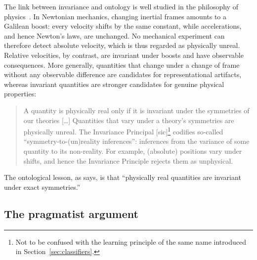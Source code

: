 The link between invariance and ontology is well studied in the philosophy of physics~\citep{saunders2003physics, jacobs2021invariance}. In Newtonian mechanics, changing inertial frames amounts to a Galilean boost: every velocity shifts by the same constant, while accelerations, and hence Newton's laws, are unchanged. No mechanical experiment can therefore detect absolute velocity, which is thus regarded as physically unreal. Relative velocities, by contrast, are invariant under boosts and have observable consequences. More generally, quantities that change under a change of frame without any observable difference are candidates for representational artifacts, whereas invariant quantities are stronger candidates for genuine physical properties:
\begin{quote}
A quantity is physically real only if it is invariant under the symmetries of our theories [\ldots] Quantities that vary under a theory's symmetries are physically unreal. The Invariance Principal [sic]\footnote{Not to be confused with the learning principle of the same name introduced in Section~\ref{sec:classifiers}.} codifies so-called ``symmetry-to-(un)reality inferences'': inferences from the variance of some quantity to its non-reality. For example, (absolute) positions vary under shifts, and hence the Invariance Principle rejects them as unphysical. \citep{jacobs2021invariance}
\end{quote}

The ontological lesson, as \citet{saunders2003physics} says, is that ``physically real quantities are invariant under exact symmetries.''

\subsection{The pragmatist argument}

